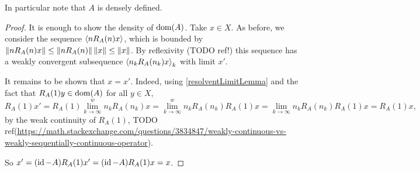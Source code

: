 In particular note that $A$ is densely defined.
\begin{proof}
It is enough to show the density of $\operatorname{dom}(A)$. Take $x\in X$. As before, we consider the sequence $\left\langle nR_A(n)x \right\rangle$, which is bounded by $\lVert nR_A(n)x\rVert \leq \lVert nR_A(n)\rVert\,\lVert x\rVert \leq \lVert x\rVert$. By reflexivity (TODO ref!) this sequence has a weakly convergent subsequence $\left\langle n_kR_A(n_k)x \right\rangle_k$ with limit $x'$. 

It remains to be shown that $x=x'$. Indeed, using \ref{resolventLimitLemma} and the fact that $R_A(1)y\in \operatorname{dom}(A)$ for all $y\in X$,
\[ R_A(1)x' = R_A(1)\lim^w_{k\to \infty}n_kR_A(n_k)x = \lim^w_{k\to \infty}n_kR_A(n_k)R_A(1)x = \lim_{k\to \infty}n_kR_A(n_k)R_A(1)x = R_A(1)x, \]
by the weak continuity of $R_A(1)$, TODO ref(\url{https://math.stackexchange.com/questions/3834847/weakly-continuous-vs-weakly-sequentially-continuous-operator}).

So $x'= (\operatorname{id} - A)R_A(1)x' = (\operatorname{id} - A)R_A(1)x = x$.
\end{proof}

